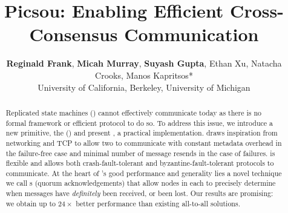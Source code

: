 \documentclass[letterpaper,twocolumn,10pt]{article}
\title{Picsou: Enabling Efficient Cross-Consensus Communication}
\author{{\bf Reginald Frank}, {\bf Micah Murray}, {\bf Suyash Gupta}, Ethan Xu, Natacha Crooks, Manos Kapritsos* \\
University of California, Berkeley, \quad *University of Michigan
}
\begin{document}
\maketitle
\begin{abstract}
 Replicated state machines () cannot effectively communicate today as there is no formal framework or efficient protocol to do so. 
To address this issue, we introduce a new primitive, the \CCCFull{} (\CCC{}) and present \Scrooge{}, a practical \CCC{} implementation.
\Scrooge{} draws inspiration from networking and TCP to allow two  to communicate with constant metadata overhead in the failure-free case and minimal number of message resends in the case of failures. 
\Scrooge{} is flexible and allows both crash-fault-tolerant and byzantine-fault-tolerant protocols to communicate. At the heart of \Scrooge{}'s good performance and generality lies a novel technique we call \quack{}s (quorum acknowledgements) that allow nodes in each \RSM{} to precisely determine when messages have \textit{definitely} been received, or  been lost. Our results are promising: we obtain up to $24\times$ better performance than existing all-to-all solutions. 
\end{abstract} 













\appendix

\end{document}
